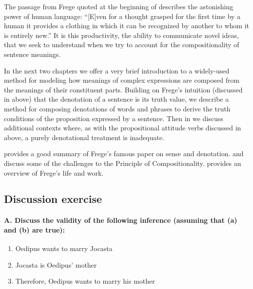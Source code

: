 The passage from Frege quoted at the beginning of  describes the astonishing power of human language: “[E]ven for a thought grasped for the first time by a human it provides a clothing in which it can be recognized by another to whom it is entirely new.” It is this productivity, the ability to communicate novel ideas, that we seek to understand when we try to account for the compositionality of sentence meanings.



In the next two chapters we offer a very brief introduction to a widely-used method for modeling how meanings of complex expressions are composed from the meanings of their constituent parts. Building on Frege’s intuition (discussed in  above) that the denotation of a sentence is its truth value, we describe a method for composing denotations of words and phrases to derive the truth conditions of the proposition expressed by a sentence. Then in  we discuss additional contexts where, as with the propositional attitude verbs discussed in  above, a purely denotational treatment is inadequate.



\furtherreading



\citet[sec. 2.1.]{Abbott2010} provides a good summary of Frege’s famous paper on sense and denotation. \citet{Goldberg2015} and \citet{PaginWesterståhl2010} discuss some of the challenges to the Principle of Compositionality. \citet{Zalta2017} provides an overview of Frege’s life and work.


\subsection*{Discussion exercise} %

\paragraph*{A. Discuss the validity of the following inference (assuming that (a) and (b) are true):}

\begin{enumerate}[label=\alph*.]
	\item  Oedipus wants to marry Jocasta
	\item Jocasta is Oedipus’ mother\WernersHRule
	\item Therefore, Oedipus wants to marry his mother
\end{enumerate}